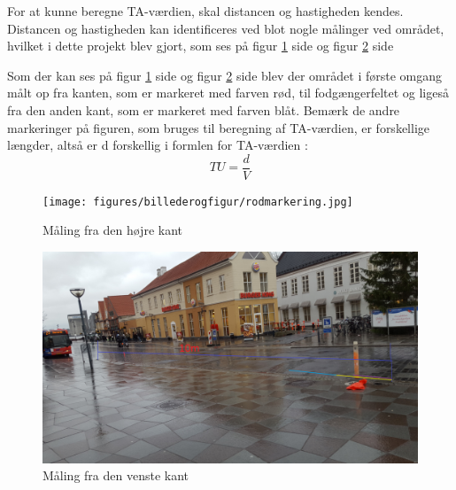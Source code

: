 For at kunne beregne TA-værdien, skal distancen og hastigheden kendes. Distancen og hastigheden kan identificeres ved blot nogle målinger ved området, hvilket i dette projekt blev gjort, som ses på figur \cref{fig:obsomrrod} side \pageref{fig:obsomrrod} og figur \cref{fig:obsomrbla} side \pageref{fig:obsomrbla}

Som der kan ses på figur \cref{fig:obsomrrod} side \pageref{fig:obsomrrod} og figur \cref{fig:obsomrbla} side \pageref{fig:obsomrbla} blev der området i første omgang målt op fra kanten, som er markeret med farven rød, til fodgængerfeltet og ligeså fra den anden kant, som er markeret med farven blåt. Bemærk de andre markeringer på figuren, som bruges til beregning af TA-værdien, er forskellige længder, altså er d forskellig i formlen for TA-værdien : $$ TU=\frac{d}{V} $$

\begin{figure}[htbp]
   \centering
   \begin{adjustbox}{max width=\textwidth}
     \texttt{[image: figures/billederogfigur/rodmarkering.jpg]}
  \end{adjustbox}
   \caption{Måling fra den højre kant}
   \label{fig:obsomrrod}
 \end{figure}

 \begin{figure}[htbp]
    \centering
    \begin{adjustbox}{max width=\textwidth}
      \includegraphics[scale=0.3]{figures/billederogfigur/blaamarkering.jpg}
   \end{adjustbox}
    \caption{Måling fra den venste kant}
    \label{fig:obsomrbla}
  \end{figure}


